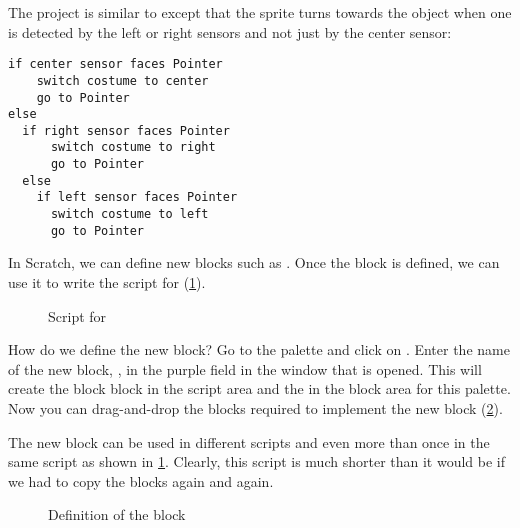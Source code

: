 \label{ch.new}


The project  is similar to  except that the
 sprite turns towards the object when one is detected by the
left or right sensors and not just by the center sensor:

\begin{footnotesize}
\begin{verbatim}
if center sensor faces Pointer
    switch costume to center
    go to Pointer
else
  if right sensor faces Pointer
      switch costume to right
      go to Pointer
  else
    if left sensor faces Pointer
      switch costume to left
      go to Pointer
\end{verbatim}
\end{footnotesize}

In Scratch, we can define new blocks such as
. Once the block is defined, we can use it
to write the script for  (\cref{fig.likes}).

\begin{figure}
\caption{Script for }\label{fig.likes}
\end{figure}

How do we define the new block? Go to the palette  and
click on . Enter the name of the new
block, , in the purple field in the  window
that is opened. This will create the block 
block in the script area and the  in the block
area for this palette. Now you can drag-and-drop the blocks required to
implement the new block (\cref{fig.go-to}).


The new block  can be used in different
scripts and even more than once in the same script as shown in
\cref{fig.likes}. Clearly, this script is much shorter than it would be
if we had to copy the blocks again and again.

\begin{figure}
\caption{Definition of the block }\label{fig.go-to}
\end{figure}
